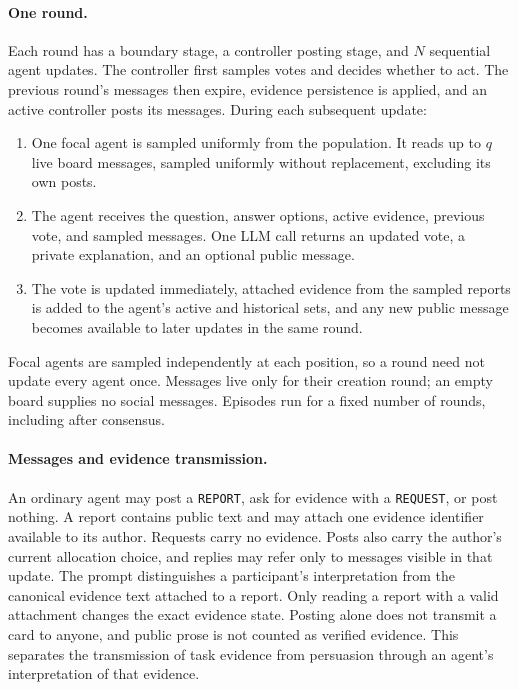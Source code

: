 \paragraph{One round.}
Each round has a boundary stage, a controller posting stage, and $N$ sequential
agent updates. The controller first samples votes and decides whether to act.
The previous round's messages then expire, evidence persistence is applied,
and an active controller posts its messages. During each subsequent update:
\begin{enumerate}[leftmargin=*,nosep]
    \item One focal agent is sampled uniformly from the population. It reads
    up to $q$ live board messages, sampled uniformly without replacement,
    excluding its own posts.
    \item The agent receives the question, answer options, active evidence,
    previous vote, and sampled messages. One LLM call returns an updated vote,
    a private explanation, and an optional public message.
    \item The vote is updated immediately, attached evidence from the sampled
    reports is added to the agent's active and historical sets, and any new
    public message becomes available to later updates in the same round.
\end{enumerate}
Focal agents are sampled independently at each position, so a round need not
update every agent once. Messages live only for their creation round; an empty
board supplies no social messages. Episodes run for a fixed number of rounds,
including after consensus.

\paragraph{Messages and evidence transmission.}
An ordinary agent may post a \texttt{REPORT}, ask for evidence with a
\texttt{REQUEST}, or post nothing. A report contains public text and may attach
one evidence identifier available to its author. Requests carry no evidence.
Posts also carry the author's current allocation choice, and replies may refer
only to messages visible in that update. The prompt distinguishes a
participant's interpretation from the canonical evidence text attached to a
report. Only reading a report with a valid attachment changes the exact
evidence state. Posting alone does not transmit a card to anyone, and public
prose is not counted as verified evidence. This separates the transmission of
task evidence from persuasion through an agent's interpretation of that evidence.

